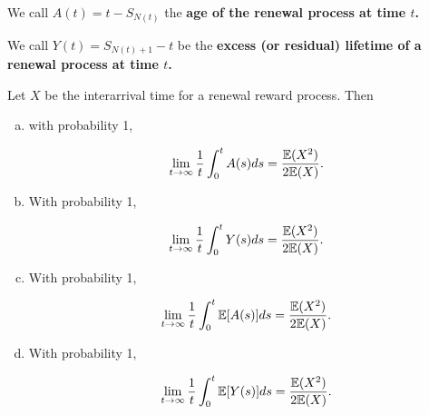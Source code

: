 \begin{definition}
We call \(A(t) = t - S_{N(t)}\) the \textbf{age of the renewal process at time \(t\).}
\end{definition}

\begin{definition}
We call \(Y(t) =  S_{N(t) + 1} - t \) be the \textbf{excess (or residual) lifetime of a renewal process at time \(t\).}
\end{definition}

\begin{proposition}\label{stoch.long.run.age.excess} Let \(X\) be the interarrival time for a renewal reward process. Then

\begin{enumerate}[(a)]

\item with probability 1,

\[
\lim_{t \to \infty} \frac{1}{t} \int_0^t A(s) ds = \frac{\E(X^2)}{2\E(X)}.
\]

\item With probability 1,

\[
\lim_{t \to \infty} \frac{1}{t} \int_0^t Y(s) ds = \frac{\E(X^2)}{2\E(X)}.
\]

\item With probability 1,

\[
\lim_{t \to \infty} \frac{1}{t} \int_0^t \E[A(s)] ds = \frac{\E(X^2)}{2\E(X)}.
\]

\item With probability 1,

\[
\lim_{t \to \infty} \frac{1}{t} \int_0^t \E[Y(s)] ds = \frac{\E(X^2)}{2\E(X)}.
\]

\end{enumerate}



\end{proposition}

